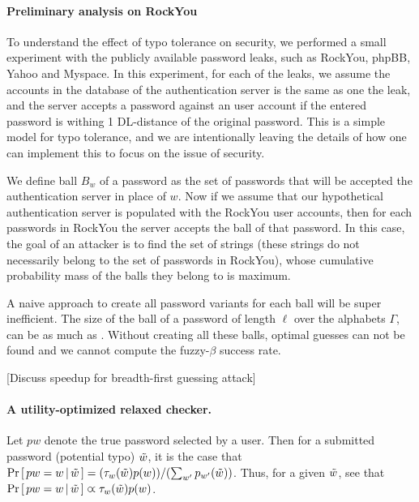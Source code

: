 \paragraph{Preliminary analysis on RockYou}
To understand the effect of typo tolerance on security, we performed a small
experiment with the publicly available password leaks, such as RockYou, phpBB,
Yahoo and Myspace.  In this experiment, for each of the leaks, we assume the
accounts in the database of the authentication server is the same as one the
leak, and the server accepts a password against an user account if the entered
password is withing 1 DL-distance of the original password.  This is a simple
model for typo tolerance, and we are intentionally leaving the details of how
one can implement this to focus on the issue of security.


We define ball $B_{w}$ of a password as the set of passwords that will be
accepted the authentication server in place of $w$.  Now if we assume that
our hypothetical authentication server is populated with the RockYou user
accounts, then for each passwords in RockYou the server accepts the ball of that
password.  In this case, the goal of an attacker is to find the set of strings
(these strings do not necessarily belong to the set of passwords in RockYou),
whose cumulative probability mass of the balls they belong to is maximum.


A naive approach to create all password variants for each ball will be super
inefficient.  The size of the ball of a password of length $\ell$ over the
alphabets $\Gamma$, can be as much as . Without
creating all these balls, optimal guesses can not be found and we cannot compute
the fuzzy-$\beta$ success rate.





[Discuss speedup for breadth-first guessing attack]


\fi


\iffalse
\paragraph{A utility-optimized relaxed checker.} Let $pw$ denote the true password selected by a user. Then for a  submitted password (potential typo) $\tilde{w}$, it is the case that ${\Pr\left[\,{pw = {w} \,|\, \tilde{w}}\,\right]} = (\tau_{{w}}(\tilde{w}) p({w})) / (\sum_{{w}'} p_{{w}'}(\tilde{w}))$. Thus, for a given $\tilde{w}$, see that ${\Pr\left[\,{pw = {w} \,|\, \tilde{w}}\,\right]} \varpropto \tau_{{w}}(\tilde{w})p({w})$.

